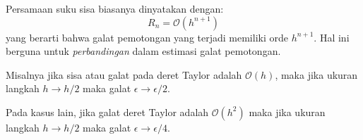 \begin{frame}
Persamaan suku sisa biasanya dinyatakan dengan:
$$
R_{n} = \mathcal{O}(h^{n+1})
$$
yang berarti bahwa galat pemotongan yang terjadi memiliki orde $h^{n+1}$. Hal ini
berguna untuk \textit{perbandingan} dalam estimasi galat pemotongan.

Misalnya jika sisa atau galat pada deret Taylor adalah $\mathcal{O}(h)$, maka
jika ukuran langkah $h \rightarrow h/2$ maka galat $\epsilon \rightarrow \epsilon/2$. 

Pada kasus lain, jika galat deret Taylor adalah $\mathcal{O}(h^2)$ maka
jika ukuran langkah $h \rightarrow h/2$ maka galat $\epsilon \rightarrow \epsilon/4$. 
\end{frame}